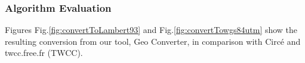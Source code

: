 \begin{figure}[!htp]
\end{figure}


\subsubsection{Algorithm Evaluation}

Figures Fig.\ref{fig:convertToLambert93} and Fig.\ref{fig:convertTowgs84utm} show the resulting conversion from our tool, Geo Converter, in comparison with Circ\'e and twcc.free.fr (TWCC).


\begin{figure}[ht!]
\end{figure}


